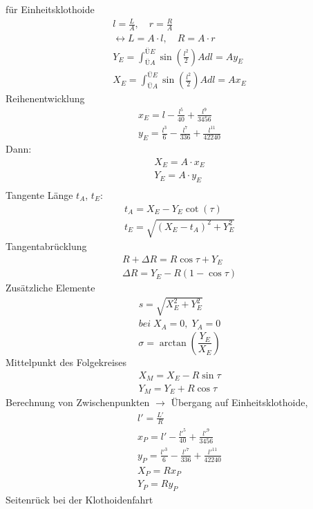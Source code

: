 \documentclass[12pt]{article}
\begin{document}
für Einheitsklothoide 
\begin{gather*}
l=\frac{L}{A}, \quad r=\frac{R}{A} \\
\longleftrightarrow L = A \cdot l,\quad R = A \cdot r \\
Y_E = \int_{ÜA}^{ÜE} \sin(\frac{l^2}{2}) A dl = A y_E \\
X_E = \int_{ÜA}^{ÜE} \sin(\frac{l^2}{2}) A dl = A x_E 
\end{gather*}
Reihenentwicklung 
\begin{gather*}
x_E = l - \frac{l^5}{40} + \frac{l^9}{3456} \\
y_E = \frac{l^3}{6} - \frac{l^7}{336} + \frac{l^{11}}{42240}
\end{gather*}
Dann:
\begin{gather*}
X_E = A \cdot x_E \\
Y_E = A \cdot y_E \\
\end{gather*}
Tangente Länge $t_A$, $t_E$:
\begin{gather*}
t_A = X_E - Y_E \cot (\tau) \\
t_E = \sqrt{(X_E - t_A)^2 + Y_E^2}
\end{gather*}
Tangentabrücklung
\begin{gather*}
R + \Delta R = R \cos \tau + Y_E \\
\Delta R = Y_E - R (1 - \cos \tau)
\end{gather*}
Zusätzliche Elemente 
\begin{gather*}
s = \sqrt{X_E^2 + Y_E^2} \\
bei\; X_A = 0, \; Y_A = 0
\end{gather*}
\begin{equation*}
\sigma = \arctan(\frac{Y_E}{X_E})
\end{equation*}
Mittelpunkt des Folgekreises
\begin{gather*}
X_M = X_E - R \sin \tau \\
Y_M = Y_E + R \cos \tau
\end{gather*}
Berechnung von Zwischenpunkten $\longrightarrow$ Übergang auf Einheitsklothoide,
\begin{gather*}
l' = \frac{L'}{R} \\
x_P = l' - \frac{l'^5}{40} + \frac{l'^9}{3456} \\
y_P = \frac{l'^3}{6} - \frac{l'^7}{336} + \frac{l'^{11}}{42240} \\
X_P = R x_P \\
Y_P =R y_P
\end{gather*}
Seitenrück bei der Klothoidenfahrt \newline
\end{document}
